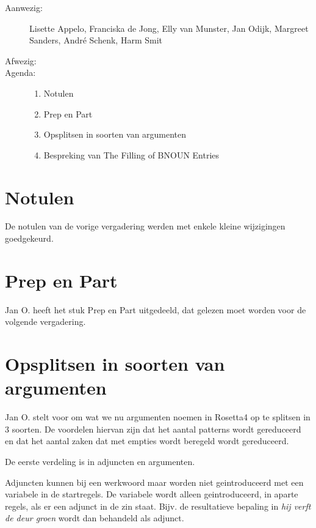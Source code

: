 

   \RosSupersedes{-}
   \MakeRosTitle
%
%
\begin{description}
\item[Aanwezig:] Lisette Appelo, Franciska de Jong, Elly van Munster,
                 Jan Odijk, Margreet Sanders,
                 Andr\'{e} Schenk,  Harm Smit
\item[Afwezig:]


\item[Agenda:]\mbox{}
  \begin{enumerate}
  \item Notulen
  \item Prep en Part
  \item Opsplitsen in soorten van argumenten
  \item Bespreking van The Filling of BNOUN Entries
  \end{enumerate}
\end{description}

\section{Notulen}
De notulen van de vorige vergadering werden met enkele kleine wijzigingen
goedgekeurd. 

\section{Prep en Part}
Jan O. heeft het stuk Prep en Part uitgedeeld, dat gelezen moet worden voor de 
volgende vergadering.

\section{Opsplitsen in soorten van argumenten}
Jan O. stelt voor om wat we nu argumenten noemen in Rosetta4 op te splitsen in
3 soorten. De voordelen hiervan zijn dat het aantal patterns wordt gereduceerd
en dat het aantal zaken dat met empties wordt beregeld wordt gereduceerd. 

De eerste verdeling is in adjuncten en argumenten.

Adjuncten kunnen bij een werkwoord maar worden niet geintroduceerd met een 
variabele in de startregels. De variabele wordt alleen geintroduceerd, in 
aparte regels, als er een adjunct in de zin staat. Bijv. de resultatieve 
bepaling in {\em hij verft de deur groen} wordt dan behandeld als adjunct.

